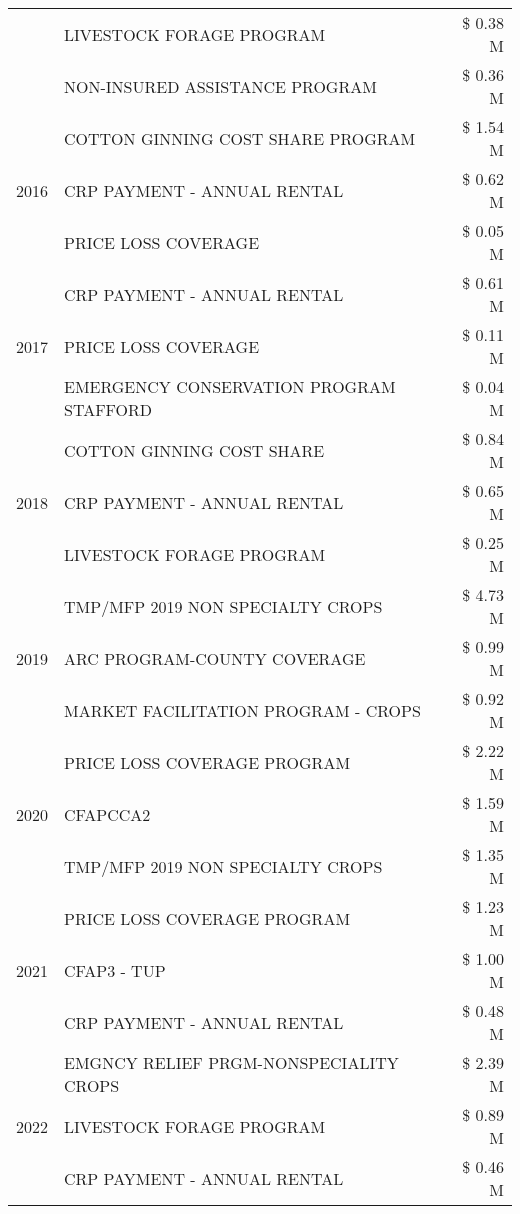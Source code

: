 \begin{tabular}{llr}
 & LIVESTOCK FORAGE PROGRAM & \$ 0.38 M \\
 & NON-INSURED ASSISTANCE PROGRAM & \$ 0.36 M \\
\cline{1-3}
\multirow[t]{3}{*}{2016} & COTTON GINNING COST SHARE PROGRAM & \$ 1.54 M \\
 & CRP PAYMENT - ANNUAL RENTAL & \$ 0.62 M \\
 & PRICE LOSS COVERAGE & \$ 0.05 M \\
\cline{1-3}
\multirow[t]{3}{*}{2017} & CRP PAYMENT - ANNUAL RENTAL & \$ 0.61 M \\
 & PRICE LOSS COVERAGE & \$ 0.11 M \\
 & EMERGENCY CONSERVATION PROGRAM STAFFORD & \$ 0.04 M \\
\cline{1-3}
\multirow[t]{3}{*}{2018} & COTTON GINNING COST SHARE & \$ 0.84 M \\
 & CRP PAYMENT - ANNUAL RENTAL & \$ 0.65 M \\
 & LIVESTOCK FORAGE PROGRAM & \$ 0.25 M \\
\cline{1-3}
\multirow[t]{3}{*}{2019} & TMP/MFP 2019 NON SPECIALTY CROPS & \$ 4.73 M \\
 & ARC PROGRAM-COUNTY COVERAGE & \$ 0.99 M \\
 & MARKET FACILITATION PROGRAM - CROPS & \$ 0.92 M \\
\cline{1-3}
\multirow[t]{3}{*}{2020} & PRICE LOSS COVERAGE PROGRAM & \$ 2.22 M \\
 & CFAPCCA2 & \$ 1.59 M \\
 & TMP/MFP 2019 NON SPECIALTY CROPS & \$ 1.35 M \\
\cline{1-3}
\multirow[t]{3}{*}{2021} & PRICE LOSS COVERAGE PROGRAM & \$ 1.23 M \\
 & CFAP3 - TUP & \$ 1.00 M \\
 & CRP PAYMENT - ANNUAL RENTAL & \$ 0.48 M \\
\cline{1-3}
\multirow[t]{3}{*}{2022} & EMGNCY RELIEF PRGM-NONSPECIALITY CROPS & \$ 2.39 M \\
 & LIVESTOCK FORAGE PROGRAM & \$ 0.89 M \\
 & CRP PAYMENT - ANNUAL RENTAL & \$ 0.46 M \\
\cline{1-3}
\bottomrule
\end{tabular}

